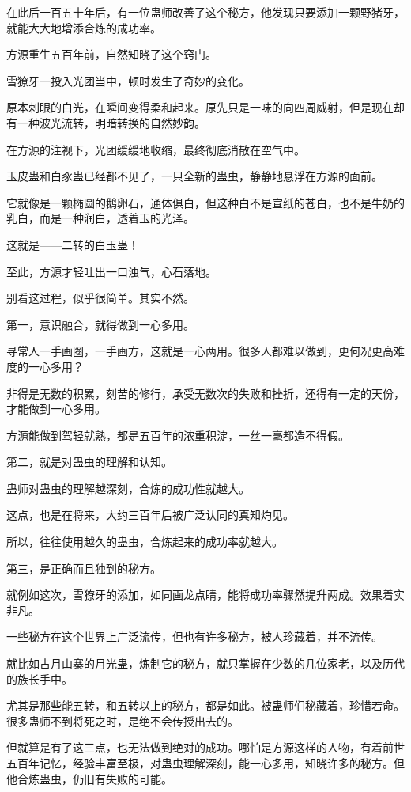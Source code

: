 \begin{this_body}
在此后一百五十年后，有一位蛊师改善了这个秘方，他发现只要添加一颗野猪牙，就能大大地增添合炼的成功率。

方源重生五百年前，自然知晓了这个窍门。

雪獠牙一投入光团当中，顿时发生了奇妙的变化。

原本刺眼的白光，在瞬间变得柔和起来。原先只是一味的向四周威射，但是现在却有一种波光流转，明暗转换的自然妙韵。

在方源的注视下，光团缓缓地收缩，最终彻底消散在空气中。

玉皮蛊和白豕蛊已经都不见了，一只全新的蛊虫，静静地悬浮在方源的面前。

它就像是一颗椭圆的鹅卵石，通体俱白，但这种白不是宣纸的苍白，也不是牛奶的乳白，而是一种润白，透着玉的光泽。

这就是——二转的白玉蛊！

至此，方源才轻吐出一口浊气，心石落地。

别看这过程，似乎很简单。其实不然。

第一，意识融合，就得做到一心多用。

寻常人一手画圈，一手画方，这就是一心两用。很多人都难以做到，更何况更高难度的一心多用？

非得是无数的积累，刻苦的修行，承受无数次的失败和挫折，还得有一定的天份，才能做到一心多用。

方源能做到驾轻就熟，都是五百年的浓重积淀，一丝一毫都造不得假。

第二，就是对蛊虫的理解和认知。

蛊师对蛊虫的理解越深刻，合炼的成功性就越大。

这点，也是在将来，大约三百年后被广泛认同的真知灼见。

所以，往往使用越久的蛊虫，合炼起来的成功率就越大。

第三，是正确而且独到的秘方。

就例如这次，雪獠牙的添加，如同画龙点睛，能将成功率骤然提升两成。效果着实非凡。

一些秘方在这个世界上广泛流传，但也有许多秘方，被人珍藏着，并不流传。

就比如古月山寨的月光蛊，炼制它的秘方，就只掌握在少数的几位家老，以及历代的族长手中。

尤其是那些能五转，和五转以上的秘方，都是如此。被蛊师们秘藏着，珍惜若命。很多蛊师不到将死之时，是绝不会传授出去的。

但就算是有了这三点，也无法做到绝对的成功。哪怕是方源这样的人物，有着前世五百年记忆，经验丰富至极，对蛊虫理解深刻，能一心多用，知晓许多的秘方。但他合炼蛊虫，仍旧有失败的可能。


\end{this_body}
